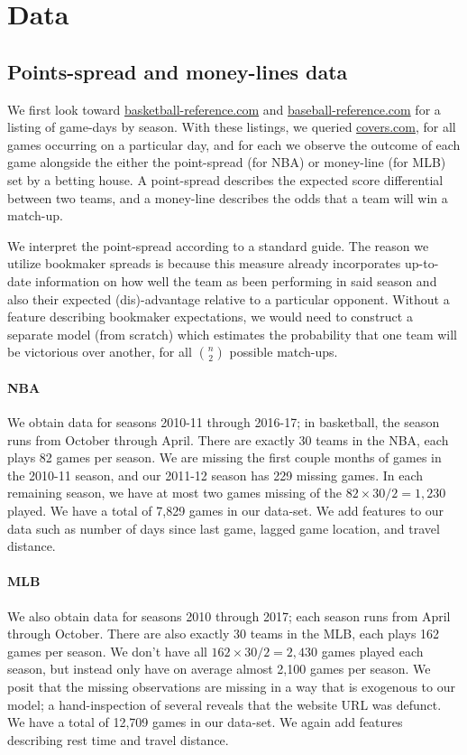 \documentclass[letterpaper,12pt]{article}
\begin{document}
\section{Data}
\subsection{Points-spread and money-lines data} We first look toward 
\href{http://www.basketball-reference.com/leagues/}{basketball-reference.com} and
\href{http://www.baseball-reference.com/leagues/}{baseball-reference.com}
for a listing of game-days by season. With these listings, we queried \href{http://www.covers.com/sports/NBA/matchups?selectedDate=2011-1-01}{covers.com},
for all games occurring on a particular day, and for each we observe the
outcome of each game alongside the either the point-spread (for NBA) or money-line (for MLB) 
set by a betting house. A point-spread describes the expected score differential
between two teams, and a money-line describes the odds that a
team will win a match-up.

We interpret the point-spread according to a standard guide.\citep{hrisports} 
The reason we utilize bookmaker spreads is because this measure already incorporates
up-to-date information on how well the team as been performing in said season and also
their expected (dis)-advantage relative to a particular opponent. Without a feature
describing bookmaker expectations, we would need to construct a separate model (from scratch)
which estimates the probability that one team will be victorious over another, for all
$\binom{n}{2}$ possible match-ups.

\paragraph{NBA}
We obtain
data for seasons 2010-11 through 2016-17; in basketball, the season runs from October through April. 
There are exactly 30 teams in the NBA,
each plays 82 games per season.
We are missing the first couple months of games 
in the 2010-11 season, and our 2011-12 season has 229 missing games. In each remaining
season, we have at most two games missing of the $82 \times 30 / 2 = 1,230$ played.
We have a total of 7,829 games in our data-set. We add features
to our data such as number of days since last game, lagged game location, and 
travel distance.

\paragraph{MLB} We also obtain data for seasons 2010 through 2017; each season runs from 
April through October. There are also exactly 30 teams in the MLB, each plays 162 games per season.
We don't have all $162 \times 30 / 2 = 2,430$ games played each season, but instead only have
on average almost 2,100 games per season. We posit that the missing observations
are missing in a way that is exogenous to our model; a hand-inspection of several
reveals that the website URL was defunct.
We have a total of 12,709 games in our data-set. We again add features describing rest time and travel distance.
\end{document}
